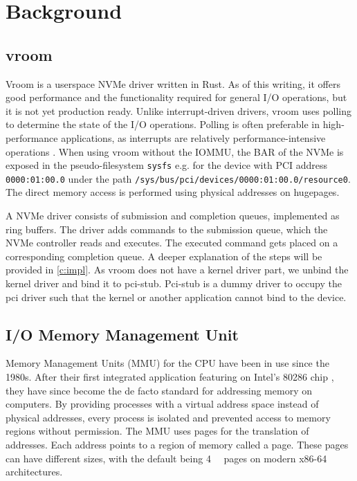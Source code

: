\chapter{Background}

\section{vroom}
Vroom is a userspace NVMe driver written in Rust. As of this writing, it offers good performance and the functionality required for general I/O operations, but it is not yet production ready. Unlike interrupt-driven drivers, vroom uses polling to determine the state of the I/O operations. Polling is often preferable in high-performance applications, as interrupts are relatively performance-intensive operations \cite{spdksubmitting}.
When using vroom without the IOMMU, the BAR of the NVMe is exposed in the pseudo-filesystem \texttt{sysfs} e.g. for the device with PCI address \texttt{0000:01:00.0} under the path \texttt{/sys/bus/pci/devices/0000:01:00.0/resource0}. The direct memory access is performed using physical addresses on hugepages.

A NVMe driver consists of submission and completion queues, implemented as ring buffers. The driver adds commands to the submission queue, which the NVMe controller reads and executes. The executed command gets placed on a corresponding completion queue. A deeper explanation of the steps will be provided in \autoref{c:impl}.
As vroom does not have a kernel driver part, we unbind the kernel driver and bind it to pci-stub. Pci-stub is a dummy driver to occupy the pci driver such that the kernel or another application cannot bind to the device.

\section{I/O Memory Management Unit}
Memory Management Units (MMU) for the CPU have been in use since the 1980s. After their first integrated application featuring on Intel's 80286 chip \cite{intel80286}, they have since become the de facto standard for addressing memory on computers. By providing processes with a virtual address space instead of physical addresses, every process is isolated and prevented access to memory regions without permission. The MMU uses pages for the translation of addresses. Each address points to a region of memory called a page. These pages can have different sizes, with the default being \qty{4}{\kibi\byte} pages on modern x86-64 architectures.


